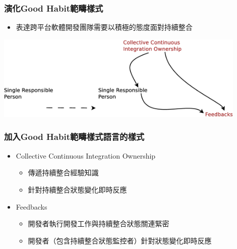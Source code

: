\documentclass[utf8x]{beamer}
\begin{document}


\begin{frame}%
\frametitle{演化Good Habit範疇樣式}
\begin{itemize}
\setlength{\itemindent}{1em}
\item[] 表達跨平台軟體開發團隊需要以積極的態度面對持續整合
\end{itemize}
\begin{center}
\includegraphics[width=12cm]{goodhabit-pattern-language-network-evo.eps}
\end{center}
\end{frame}

\begin{frame}
\frametitle{加入Good Habit範疇樣式語言的樣式}
\begin{itemize}
\setlength{\itemindent}{1em}
\item[] Collective Continuous Integration Ownership
\begin{itemize}
\item 傳遞持續整合經驗知識
\item 針對持續整合狀態變化即時反應
\end{itemize}
\item[] Feedbacks
\begin{itemize}
\item 開發者執行開發工作與持續整合狀態關連緊密
\item 開發者（包含持續整合狀態監控者）針對狀態變化即時反應
\end{itemize}
\end{itemize}
\end{frame}
\end{document}
